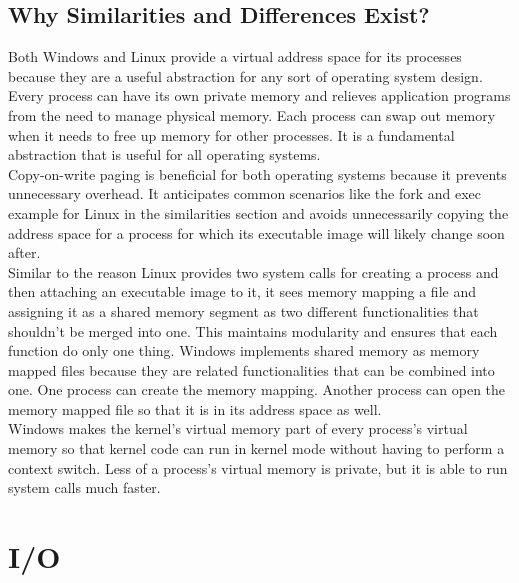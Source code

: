 \documentclass[letterpaper,10pt,titlepage]{article}
\begin{document}
\subsection{Why Similarities and Differences Exist?}
Both Windows and Linux provide a virtual address space for its processes
because they are a useful abstraction for any sort of operating system 
design. Every process can have its own private memory and relieves application
programs from the need to manage physical memory. Each process can swap out
memory when it needs to free up memory for other processes. It is a fundamental
abstraction that is useful for all operating systems.
\\
\linebreak
Copy-on-write paging is beneficial for both operating systems because it 
prevents unnecessary overhead. It anticipates common scenarios like the fork
and exec example for Linux in the similarities section and avoids 
unnecessarily copying the address space for a process for which its 
executable image will likely change soon after.
\\
\linebreak
Similar to the reason Linux provides two system calls for creating a process 
and then attaching an executable image to it, it sees memory mapping a file 
and assigning it as a shared memory segment as two different functionalities
that shouldn't be merged into one. This maintains modularity and ensures that
each function do only one thing. Windows implements shared memory as memory 
mapped files because they are related functionalities that can be combined 
into one. One process can create the memory mapping. Another process can
open the memory mapped file so that it is in its address space as well. 
\\
\linebreak
Windows makes the kernel's virtual memory part of every process's virtual 
memory so that kernel code can run in kernel mode without having to perform a 
context switch. Less of a process's virtual memory is private, but it is able
to run system calls much faster. 
\section{I/O}
\end{document}
